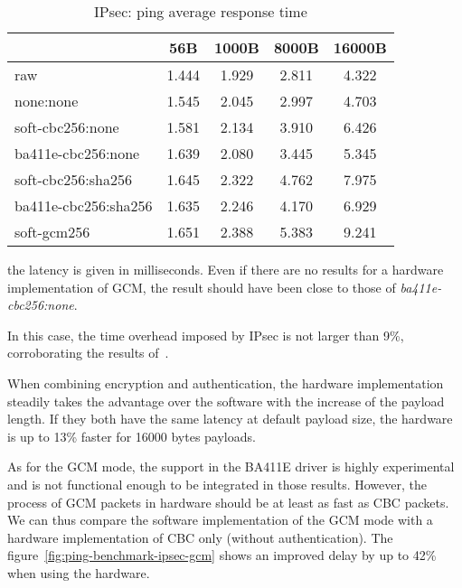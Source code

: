 \begin{table}[ht]
\center
\small
\begin{tabular}{l|c|c|c|c|} \cline{2-5}
 & 56B & 1000B & 8000B & 16000B \\ \hline
\multicolumn{1}{|l|}{raw} & 1.444 & 1.929 & 2.811 & 4.322 \\ \hline
\multicolumn{1}{|l|}{none:none} & 1.545 & 2.045 & 2.997 & 4.703 \\ \hline
\multicolumn{1}{|l|}{soft-cbc256:none} & 1.581 & 2.134 & 3.910 & 6.426 \\ \hline
\multicolumn{1}{|l|}{ba411e-cbc256:none} & 1.639 & 2.080 & 3.445 & 5.345 \\ \hline
\multicolumn{1}{|l|}{soft-cbc256:sha256} & 1.645 & 2.322 & 4.762 & 7.975 \\ \hline
\multicolumn{1}{|l|}{ba411e-cbc256:sha256} & 1.635 & 2.246 & 4.170 & 6.929 \\ \hline
\multicolumn{1}{|l|}{soft-gcm256} & 1.651 & 2.388 & 5.383 & 9.241 \\ \hline
\end{tabular}
\caption{IPsec: ping average response time}{the latency is given in milliseconds. Even if there are no results for a hardware implementation of GCM, the result should have been close to those of \textit{ba411e-cbc256:none}.}
\label{tab:ping-benchmark-ipsec}
\end{table}

In this case, the time overhead imposed by IPsec is not larger than 9\%, corroborating the results of~\citet{Xenakis20063225}.

When combining encryption and authentication, the hardware implementation steadily takes the advantage over the software with the increase of the payload length.
If they both have the same latency at default payload size, the hardware is up to 13\% faster for 16000 bytes payloads.

As for the GCM mode, the support in the BA411E driver is highly experimental and is not functional enough to be integrated in those results.
However, the process of GCM packets in hardware should be at least as fast as CBC packets.
We can thus compare the software implementation of the GCM mode with a hardware implementation of CBC only (without authentication).
The figure~\ref{fig:ping-benchmark-ipsec-gcm} shows an improved delay by up to 42\% when using the hardware.



